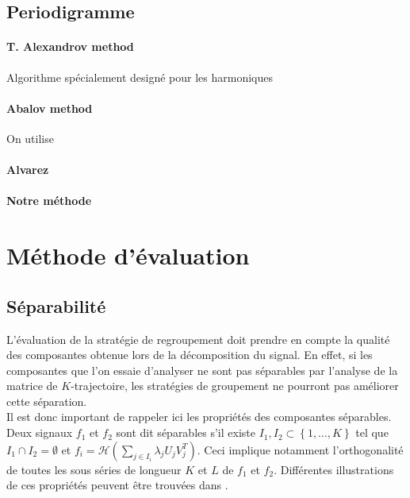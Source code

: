 \documentclass{gretsi}
\begin{document}
\subsection{Periodigramme}

\paragraph{T. Alexandrov method}
\label{par:alex}
\cite{alexandrov_05_auto}

Algorithme spécialement designé pour les harmoniques


\paragraph{Abalov method}
\label{par:abalov}
\cite{abalov_14_auto}
On utilise
\paragraph{Alvarez}
\label{par:alva}
\cite{alvarez_2013_auto}
\paragraph{Notre méthode}
\label{par:tomtom}


        

\section{Méthode d'évaluation}
\label{sec:eval}

\subsection{Séparabilité}
\label{sub:sep}
    L'évaluation de la stratégie de regroupement doit prendre en compte la qualité des composantes obtenue lors de la décomposition du signal. En effet, si les composantes que l'on essaie d'analyser ne sont pas séparables par l'analyse de la matrice de $K$-trajectoire, les stratégies de groupement ne pourront pas améliorer cette séparation.\\
    
    Il est donc important de rappeler ici les propriétés des composantes séparables. Deux signaux $f_1$ et $f_2$ sont dit séparables s'il existe $I_1, I_2 \subset \left \{ 1,\dots, K \right \}$ tel que $I_1\cap I_2 = \emptyset$ et $f_i = \mathcal H(\sum_{j \in I_i} \lambda_j U_j V_j^T)$. Ceci implique notamment l'orthogonalité de toutes les sous séries de longueur $K$ et $L$ de $f_1$ et $f_2$. Différentes illustrations de ces propriétés peuvent être trouvées dans \cite{GNZ_10_SSA}.
\end{document}
